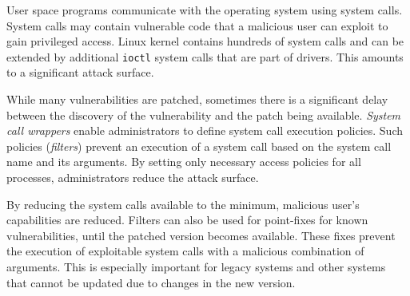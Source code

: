 User space programs communicate with the operating system using system calls.
System calls may contain vulnerable code that a malicious user can exploit to
gain privileged access. Linux kernel contains hundreds of system calls and
can be extended by additional \texttt{ioctl} system calls that are part of
drivers. This amounts to a significant attack surface.


While many vulnerabilities are patched, sometimes there is a significant delay
between the discovery of the vulnerability and the patch being available.
\emph{System call wrappers} enable administrators to define system call
execution policies. Such policies (\emph{filters}) prevent an execution of a
system call based on the system call name and its arguments. By setting only
necessary access policies for all processes, administrators reduce the attack
surface.


By reducing the system calls available to the minimum, malicious user's
capabilities are reduced. Filters can also be used for point-fixes for known
vulnerabilities, until the patched version becomes available. These fixes
prevent the execution of exploitable system calls with a malicious combination
of arguments. This is especially important for legacy systems and other systems
that cannot be updated due to changes in the new version.


